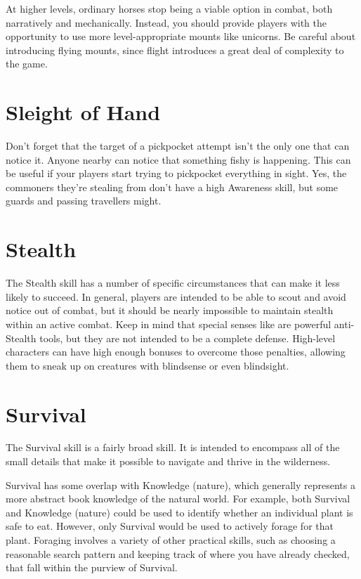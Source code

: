     At higher levels, ordinary horses stop being a viable option in combat, both narratively and mechanically.
    Instead, you should provide players with the opportunity to use more level-appropriate mounts like unicorns.
    Be careful about introducing flying mounts, since flight introduces a great deal of complexity to the game.

\section{Sleight of Hand}
    Don't forget that the target of a pickpocket attempt isn't the only one that can notice it.
    Anyone nearby can notice that something fishy is happening.
    This can be useful if your players start trying to pickpocket everything in sight.
    Yes, the commoners they're stealing from don't have a high Awareness skill, but some guards and passing travellers might.


\section{Stealth}
    The Stealth skill has a number of specific circumstances that can make it less likely to succeed.
    In general, players are intended to be able to scout and avoid notice out of combat, but it should be nearly impossible to maintain stealth within an active combat.
    Keep in mind that special senses like  are powerful anti-Stealth tools, but they are not intended to be a complete defense.
    High-level characters can have high enough bonuses to overcome those penalties, allowing them to sneak up on creatures with blindsense or even blindsight.

\section{Survival}
    The Survival skill is a fairly broad skill.
    It is intended to encompass all of the small details that make it possible to navigate and thrive in the wilderness.

    Survival has some overlap with Knowledge (nature), which generally represents a more abstract book knowledge of the natural world.
    For example, both Survival and Knowledge (nature) could be used to identify whether an individual plant is safe to eat.
    However, only Survival would be used to actively forage for that plant.
    Foraging involves a variety of other practical skills, such as choosing a reasonable search pattern and keeping track of where you have already checked, that fall within the purview of Survival.

